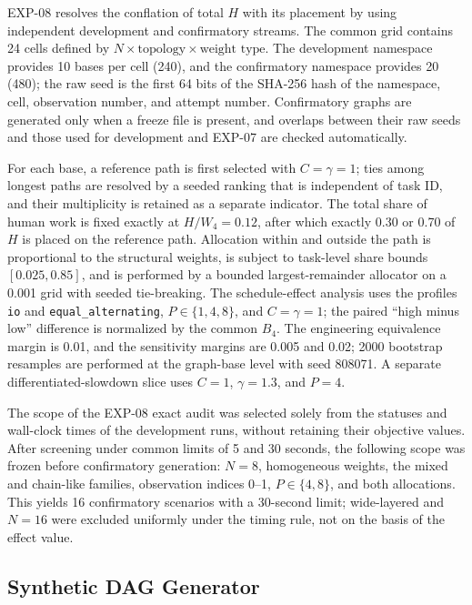 EXP-08 resolves the conflation of total $H$ with its placement by using
independent development and confirmatory streams. The common grid contains 24
cells defined by $N\times\text{topology}\times\text{weight type}$. The
development namespace provides 10 bases per cell (240), and the confirmatory
namespace provides 20 (480); the raw seed is the first 64 bits of the SHA-256
hash of the namespace, cell, observation number, and attempt number.
Confirmatory graphs are generated only when a freeze file is present, and
overlaps between their raw seeds and those used for development and EXP-07 are
checked automatically.

For each base, a reference path is first selected with $C=\gamma=1$; ties among
longest paths are resolved by a seeded ranking that is independent of task ID,
and their multiplicity is retained as a separate indicator. The total share of
human work is fixed exactly at $H/W_4=0.12$, after which exactly 0.30 or 0.70 of
$H$ is placed on the reference path. Allocation within and outside the path is
proportional to the structural weights, is subject to task-level share bounds
$[0.025,0.85]$, and is performed by a bounded largest-remainder allocator on a
0.001 grid with seeded tie-breaking. The schedule-effect analysis uses the
profiles \texttt{io} and \texttt{equal\_alternating}, $P\in\{1,4,8\}$, and
$C=\gamma=1$; the paired ``high minus low'' difference is normalized by the
common $B_4$. The engineering equivalence margin is 0.01, and the sensitivity
margins are 0.005 and 0.02; 2000 bootstrap resamples are performed at the
graph-base level with seed 808071. A separate differentiated-slowdown slice
uses $C=1$, $\gamma=1.3$, and $P=4$.

The scope of the EXP-08 exact audit was selected solely from the statuses and
wall-clock times of the development runs, without retaining their objective
values. After screening under common limits of 5 and 30 seconds, the following
scope was frozen before confirmatory generation: $N=8$, homogeneous weights,
the mixed and chain-like families, observation indices 0--1,
$P\in\{4,8\}$, and both allocations. This yields 16 confirmatory scenarios with
a 30-second limit; wide-layered and $N=16$ were excluded uniformly under the
timing rule, not on the basis of the effect value.

\subsection{Synthetic DAG Generator}

